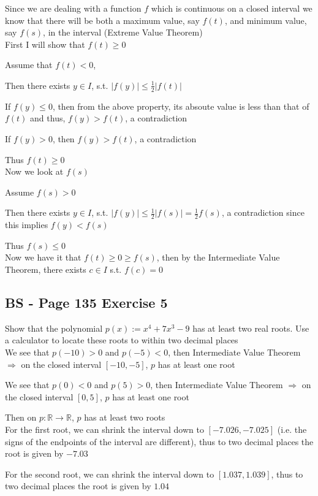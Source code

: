 \documentclass{article}
\begin{document}
Since we are dealing with a function \(f\) which is continuous on a closed interval we know that there will
be both a maximum value, say \(f(t)\), and minimum value, say \(f(s)\), in the interval (Extreme Value Theorem)
\\

First I will show that \(f(t) \geq 0\)

Assume that \(f(t) < 0\),

Then there exists \(y \in I\), s.t. \(|f(y)| \leq \frac{1}{2}|f(t)|\)

If \(f(y) \leq 0\), then from the above property, its absoute value is less than that of 
\(f(t)\) and thus, \(f(y) > f(t)\), a contradiction

If \(f(y) > 0\), then \(f(y) > f(t)\), a contradiction

Thus \(f(t) \geq 0\)
\\

Now we look at \(f(s)\)

Assume \(f(s) > 0\)

Then there exists \(y \in I\), s.t. \(|f(y)| \leq \frac{1}{2}|f(s)| = \frac{1}{2}f(s) \), a contradiction since this
implies \(f(y) < f(s)\)

Thus \(f(s) \leq 0\)
\\

Now we have it that \(f(t) \geq 0 \geq f(s)\), then by the Intermediate Value Theorem, there exists
\(c \in I\) s.t. \(f(c) = 0\)


\subsection*{BS - Page 135 Exercise 5}
Show that the polynomial \(p(x) := x^4 + 7x^3 - 9\) has at least two real roots. Use
a calculator to locate these roots to within two decimal places
\\

We see that \(p(-10) > 0\) and \(p(-5) < 0\), then Intermediate Value Theorem \(\Rightarrow\) on the closed interval \([-10,-5]\),
\(p\) has at least one root

We see that \(p(0) < 0\) and \(p(5) > 0\), then Intermediate Value Theorem \(\Rightarrow\) on the closed interval \([0,5]\),
\(p\) has at least one root

Then on \(p:\mathbb{R} \rightarrow \mathbb{R}\), \(p\) has at least two roots
\\

For the first root, we can shrink the interval down to \([-7.026,-7.025]\) (i.e. the signs of the endpoints of the interval are 
different), thus to two decimal places the root is given by \(-7.03\)

For the second root, we can shrink the interval down to \([1.037, 1.039]\), thus to two decimal places
the root is given by \(1.04\)
\end{document}
